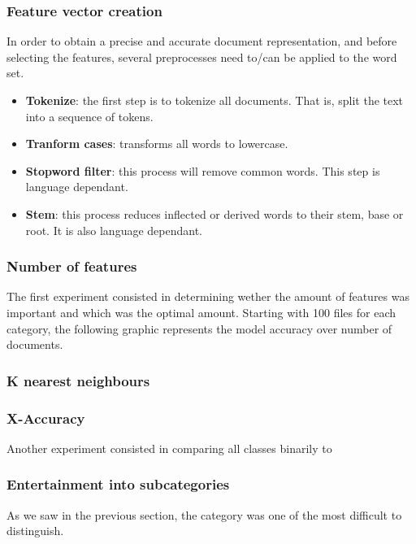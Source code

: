 \subsubsection{Feature vector creation}
In order to obtain a precise and accurate document representation, and before selecting the features, several preprocesses need to/can be applied to the word set.
\begin{itemize}
  \item {\bf Tokenize}: the first step is to tokenize all documents. That is, split the text into a sequence of tokens. 
  \item {\bf Tranform cases}: transforms all words to lowercase.
  \item {\bf Stopword filter}: this process will remove common words. This step is language dependant.
  \item {\bf Stem}: this process reduces inflected or derived words to their stem, base or root. It is also language dependant.
\end{itemize}



\subsubsection{Number of features}
The first experiment consisted in determining wether the amount of features was important and which was the optimal amount. Starting with 100 files for each category, the following graphic
represents the model accuracy over number of documents. 

\subsubsection{K nearest neighbours}

\subsubsection{X-Accuracy}
Another experiment consisted in comparing all classes binarily to  


\subsubsection{Entertainment into subcategories}
As we saw in the previous section, the category  was one of the most difficult to distinguish. 

